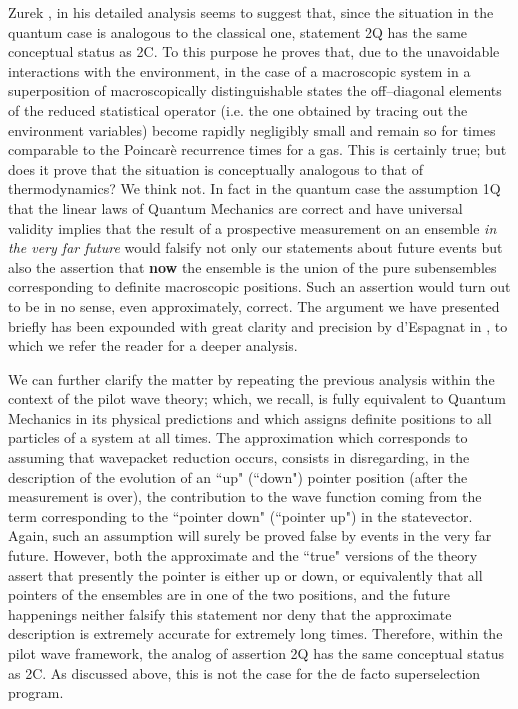 \documentclass[10pt,a4paper]{article}
\begin{document}
Zurek \cite{zur1,zu}, in his detailed analysis seems to suggest
that, since the situation in the quantum case is analogous to the
classical one, statement 2Q has the same conceptual status as 2C.
To this purpose he proves that, due to the unavoidable
interactions with the environment, in the case of a macroscopic
system in a superposition of macroscopically distinguishable
states the off--diagonal elements of the reduced statistical
operator (i.e. the one obtained by tracing out the environment
variables) become rapidly negligibly small and remain so for times
comparable to the Poincar\`e recurrence times for a gas. This is
certainly true; but does it prove that the situation is
conceptually analogous to that of thermodynamics? We think not. In
fact in the quantum case the assumption 1Q that the linear laws of
Quantum Mechanics are correct and have universal validity implies
that the result of a prospective measurement on an ensemble {\it
in the very far future} would falsify not only our statements
about future events but also the assertion that {\bf now} the
ensemble is the union of the pure subensembles corresponding to
definite macroscopic positions. Such an assertion would turn out
to be in no sense, even approximately, correct. The argument we
have presented briefly has been expounded with great clarity and
precision by d'Espagnat in \cite{be1}, to which we refer the
reader for a deeper analysis.

We can further clarify the matter by repeating the previous
analysis within the context of the pilot wave theory; which, we
recall, is fully equivalent to Quantum Mechanics in its physical
predictions and which assigns definite positions to all particles
of a system at all times. The approximation which corresponds to
assuming that wavepacket reduction occurs, consists in
disregarding, in the description of the evolution of an ``up"
(``down") pointer position (after the measurement is over), the
contribution to the wave function coming from the term
corresponding to the ``pointer down" (``pointer up") in the
statevector. Again, such an assumption will surely be proved false
by events in the very far future. However, both the approximate
and the ``true" versions of the theory assert that presently the
pointer is either up or down, or equivalently that all pointers of
the ensembles are in one of the two positions, and the future
happenings neither falsify this statement nor deny that the
approximate description is extremely accurate for extremely long
times. Therefore, within the pilot wave framework, the analog of
assertion 2Q has the same conceptual status as 2C. As discussed
above, this is not the case for the de facto superselection
program.
\end{document}
